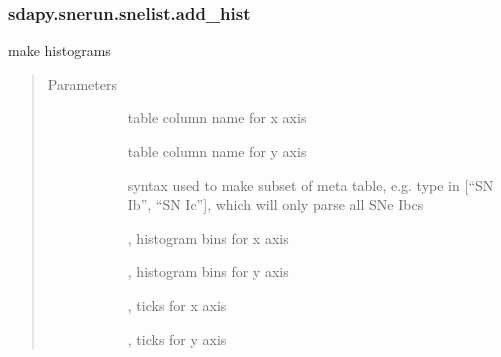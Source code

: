 \documentclass[letterpaper,10pt,english]{sphinxmanual}
\begin{document}
\begin{fulllineitems}
\subsubsection{sdapy.snerun.snelist.add\_hist}
\label{\detokenize{generated/sdapy.snerun.snelist.add_hist:sdapy-snerun-snelist-add-hist}}\label{\detokenize{generated/sdapy.snerun.snelist.add_hist::doc}}

\begin{fulllineitems}
\label{\detokenize{generated/sdapy.snerun.snelist.add_hist:sdapy.snerun.snelist.add_hist}}
make histograms
\begin{quote}\begin{description}
\item[{Parameters}] \leavevmode\begin{description}
\item[{}] \leavevmode{[}\sphinxtitleref{float}{]}
table column name for x axis

\item[{}] \leavevmode{[}\sphinxtitleref{str}{]}
table column name for y axis

\item[{}] \leavevmode{[}\sphinxtitleref{str}{]}
syntax used to make subset of meta table, e.g.
type in {[}“SN Ib”, “SN Ic”{]}, which will only parse all SNe Ibcs

\item[{}] \leavevmode{[}, \sphinxtitleref{list}{]}
histogram bins for x axis

\item[{}] \leavevmode{[}, \sphinxtitleref{list}{]}
histogram bins for y axis

\item[{}] \leavevmode{[}, \sphinxtitleref{list}{]}
ticks for x axis

\item[{}] \leavevmode{[}, \sphinxtitleref{list}{]}
ticks for y axis


\end{description}
\end{description}
\end{quote}
\end{fulllineitems}
\end{fulllineitems}
\end{document}
